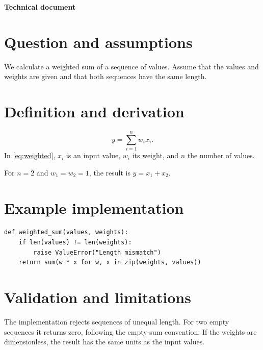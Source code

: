 \def\lakitlanguageprofile{english}
\def\lakitmainlanguage{english}
\def\lakitdocumentclass{article}
\def\lakitclassoptions{11pt,a4paper}
\def\lakitgeometryoptions{margin=2.2cm,headheight=14pt}
\def\lakitlinespread{1.18}
\def\lakitparagraphstyle{block}




{\LARGE\sffamily\bfseries\noindent Technical document\par}\medskip
\section{Question and assumptions}
We calculate a weighted sum of a sequence of values. Assume that the values
and weights are given and that both sequences have the same length.
\section{Definition and derivation}
\begin{equation}\label{eq:weighted}
y=\sum_{i=1}^{n}w_i x_i.
\end{equation}
In \eqref{eq:weighted}, $x_i$ is an input value, $w_i$ its weight, and $n$ the
number of values.
\begin{exbox}[frametitle={A simple check}]
For $n=2$ and $w_1=w_2=1$, the result is $y=x_1+x_2$.
\end{exbox}
\section{Example implementation}
\begin{codebox}[frametitle={Python}]
\begin{asmblock}
\begin{lstlisting}[style=pystyle]
def weighted_sum(values, weights):
    if len(values) != len(weights):
        raise ValueError("Length mismatch")
    return sum(w * x for w, x in zip(weights, values))
\end{lstlisting}
\end{asmblock}
\end{codebox}
\section{Validation and limitations}
The implementation rejects sequences of unequal length. For two empty sequences
it returns zero, following the empty-sum convention. If the weights are
dimensionless, the result has the same units as the input values.

